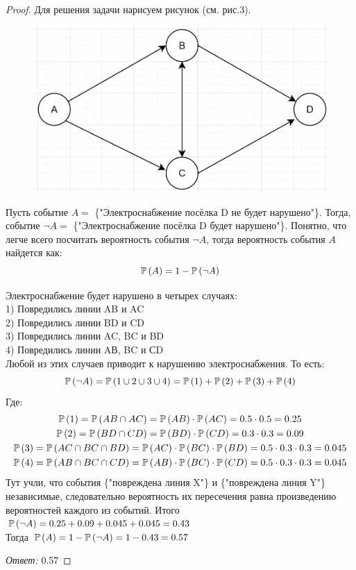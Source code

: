 \begin{proof}
Для решения задачи нарисуем рисунок (см. рис.3).
\begin{figure}[h!]
    \centering
    \includegraphics[width=0.5\linewidth]{3.png}
    \caption{}
    \label{fig:enter-label}
\end{figure}

Пусть событие $ A = $ \{"Электроснабжение посёлка D не будет нарушено"\}. Тогда, событие $ \neg A = $ \{"Электроснабжение посёлка D будет нарушено"\}. Понятно, что легче всего посчитать вероятность события $ \neg A $, тогда вероятность события $ A $ найдется как:
\[
\mathbb P\left(A\right) = 1 - \mathbb P\left(\neg A\right)
\]

Электроснабжение будет нарушено в четырех случаях:\\
1) Повредились линии AB и AC\\
2) Повредились линии BD и CD\\
3) Повредились линии AC, BC и BD\\
4) Повредились линии AВ, BC и СD\\
Любой из этих случаев приводит к нарушению электроснабжения.
То есть:
\[
\mathbb P\left(\neg A\right) = \mathbb P\left(1\cup 2\cup 3\cup 4\right) = \mathbb P\left(1\right) + \mathbb P\left(2\right) + \mathbb P\left(3\right) + \mathbb P\left(4\right)
\]
Где:
\begin{gather*}
    \mathbb P\left(1\right) = \mathbb P\left(AB\cap AC\right) = \mathbb P\left(AB\right)\cdot\mathbb P\left(AC\right) = 0.5\cdot 0.5 = 0.25\\
    \mathbb P\left(2\right) = \mathbb P\left(BD\cap CD\right) = \mathbb P\left(BD\right)\cdot\mathbb P\left(CD\right) = 0.3\cdot 0.3 = 0.09\\
    \mathbb P\left(3\right) = \mathbb P\left(AC\cap BC\cap BD\right) = \mathbb P\left(AC\right)\cdot\mathbb P\left(BC\right)\cdot\mathbb P\left(BD\right) = 0.5\cdot 0.3\cdot 0.3 = 0.045\\
    \mathbb P\left(4\right) = \mathbb P\left(AB\cap BC\cap CD\right) = \mathbb P\left(AB\right)\cdot\mathbb P\left(BC\right)\cdot\mathbb P\left(CD\right) = 0.5\cdot 0.3\cdot 0.3 = 0.045
\end{gather*}
Тут учли, что события \{"повреждена линия X"\} и \{"повреждена линия Y"\} независимые, следовательно вероятность их пересечения равна произведению вероятностей каждого из событий.
Итого $ \mathbb P\left(\neg A\right) = 0.25 + 0.09 + 0.045 + 0.045 = 0.43 $\\
Тогда $ \mathbb P\left(A\right) = 1 - \mathbb P\left(\neg A\right) = 1 - 0.43 = 0.57$

{\it Ответ:} 0.57
\end{proof}

